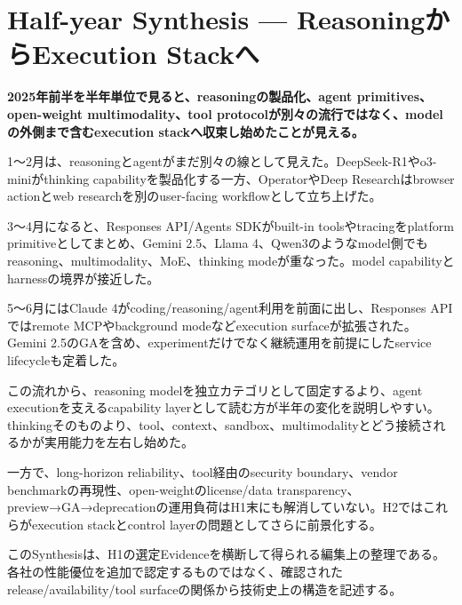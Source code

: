 \section{Half-year Synthesis — ReasoningからExecution Stackへ}
\label{pkg:synthesis}
\noindent\textbf{2025年前半を半年単位で見ると、reasoningの製品化、agent primitives、open-weight multimodality、tool protocolが別々の流行ではなく、modelの外側まで含むexecution stackへ収束し始めたことが見える。}\autocite{src-421ee9af3f80,src-4ec03078d316,src-78593f4b387f}

1〜2月は、reasoningとagentがまだ別々の線として見えた。DeepSeek-R1やo3-miniがthinking capabilityを製品化する一方、OperatorやDeep Researchはbrowser actionとweb researchを別のuser-facing workflowとして立ち上げた。\autocite{src-421ee9af3f80}


3〜4月になると、Responses API/Agents SDKがbuilt-in toolsやtracingをplatform primitiveとしてまとめ、Gemini 2.5、Llama 4、Qwen3のようなmodel側でもreasoning、multimodality、MoE、thinking modeが重なった。model capabilityとharnessの境界が接近した。\autocite{src-05f285e9757b,src-3e4a3f3b3d83,src-421ee9af3f80,src-78593f4b387f}


5〜6月にはClaude 4がcoding/reasoning/agent利用を前面に出し、Responses APIではremote MCPやbackground modeなどexecution surfaceが拡張された。Gemini 2.5のGAを含め、experimentだけでなく継続運用を前提にしたservice lifecycleも定着した。\autocite{src-4ec03078d316,src-9257c39d4172}


この流れから、reasoning modelを独立カテゴリとして固定するより、agent executionを支えるcapability layerとして読む方が半年の変化を説明しやすい。thinkingそのものより、tool、context、sandbox、multimodalityとどう接続されるかが実用能力を左右し始めた。\autocite{src-421ee9af3f80,src-4ec03078d316,src-78593f4b387f}


一方で、long-horizon reliability、tool経由のsecurity boundary、vendor benchmarkの再現性、open-weightのlicense/data transparency、preview→GA→deprecationの運用負荷はH1末にも解消していない。H2ではこれらがexecution stackとcontrol layerの問題としてさらに前景化する。\autocite{src-05f285e9757b,src-3e4a3f3b3d83,src-9257c39d4172}


\begin{claimboundary}
このSynthesisは、H1の選定Evidenceを横断して得られる編集上の整理である。各社の性能優位を追加で認定するものではなく、確認されたrelease/availability/tool surfaceの関係から技術史上の構造を記述する。
\end{claimboundary}
